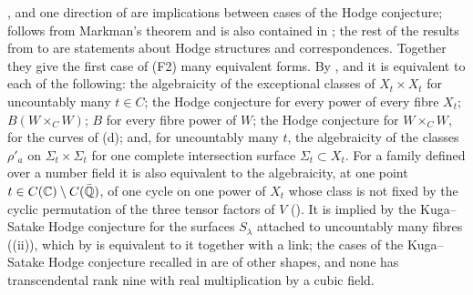 \begin{remark}\label{rem:mumfordpowersopen}
,  and one direction of
 are implications between cases of the Hodge
conjecture;  follows from Markman's theorem and
is also contained in \cite{Li26}; the rest of the results from
 to  are statements about
Hodge structures and correspondences. Together they give the first case of
(F2) many equivalent forms. By ,  and
 it is equivalent to each of the following: the
algebraicity of the exceptional classes of $X_{t}\times X_{t}$ for uncountably
many $t\in C$; the Hodge conjecture for every power of every fibre $X_{t}$;
$B(W\times_{C}W)$; $B$ for every fibre power of $W$; the Hodge conjecture for
$W\times_{C}W$, for the curves of (d); and, for
uncountably many $t$, the algebraicity of the classes $\rho'_{a}$ on
$\Sigma_{t}\times\Sigma_{t}$ for one complete intersection surface
$\Sigma_{t}\subset X_{t}$. For a family defined over a number field it is
also equivalent to the algebraicity, at one point $t\in C(\mathbb{C})\setminus
C(\bar{\mathbb{Q}})$, of one cycle on one power of $X_{t}$ whose class is not fixed
by the cyclic permutation of the three tensor factors of $V$
(). It is implied by the Kuga--Satake Hodge
conjecture for the surfaces $S_{\lambda}$ attached to uncountably many fibres
((ii)), which by  is equivalent
to it together with a link; the cases of the Kuga--Satake Hodge conjecture
recalled in  are of other shapes, and none has
transcendental rank nine with real multiplication by a cubic field.


\end{remark}
